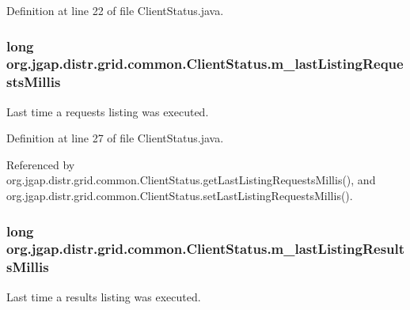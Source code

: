 Definition at line 22 of file Client\-Status.\-java.

\hypertarget{classorg_1_1jgap_1_1distr_1_1grid_1_1common_1_1_client_status_aebf08467549930ad382ab8b188ff83ac}{
\subsubsection[{m\-\_\-last\-Listing\-Requests\-Millis}]{\setlength{\rightskip}{0pt plus 5cm}long org.\-jgap.\-distr.\-grid.\-common.\-Client\-Status.\-m\-\_\-last\-Listing\-Requests\-Millis\hspace{0.3cm}{\ttfamily [private]}}}\label{classorg_1_1jgap_1_1distr_1_1grid_1_1common_1_1_client_status_aebf08467549930ad382ab8b188ff83ac}
Last time a requests listing was executed. 

Definition at line 27 of file Client\-Status.\-java.



Referenced by org.\-jgap.\-distr.\-grid.\-common.\-Client\-Status.\-get\-Last\-Listing\-Requests\-Millis(), and org.\-jgap.\-distr.\-grid.\-common.\-Client\-Status.\-set\-Last\-Listing\-Requests\-Millis().

\hypertarget{classorg_1_1jgap_1_1distr_1_1grid_1_1common_1_1_client_status_ac9e68055b17c703a0945260eae356fac}{
\subsubsection[{m\-\_\-last\-Listing\-Results\-Millis}]{\setlength{\rightskip}{0pt plus 5cm}long org.\-jgap.\-distr.\-grid.\-common.\-Client\-Status.\-m\-\_\-last\-Listing\-Results\-Millis\hspace{0.3cm}{\ttfamily [private]}}}\label{classorg_1_1jgap_1_1distr_1_1grid_1_1common_1_1_client_status_ac9e68055b17c703a0945260eae356fac}
Last time a results listing was executed. 

